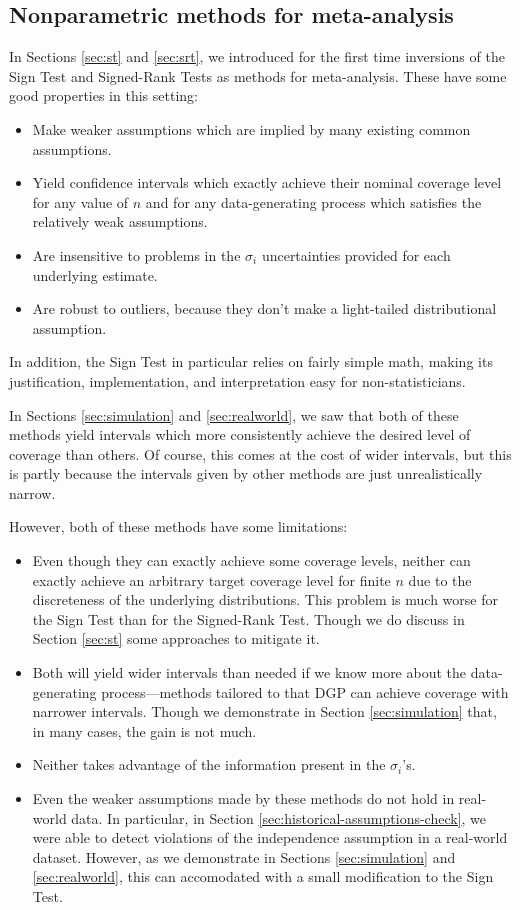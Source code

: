 \documentclass[letterpaper,12pt]{article}
\begin{document}
\subsection{Nonparametric methods for meta-analysis}
In Sections \ref{sec:st} and \ref{sec:srt}, we introduced for the first time inversions of the Sign Test and Signed-Rank Tests as methods for meta-analysis. These have some good properties in this setting:
\begin{itemize}
\item Make weaker assumptions which are implied by many existing common assumptions.
\item Yield confidence intervals which exactly achieve their nominal coverage level for any value of $n$ and for any data-generating process which satisfies the relatively weak assumptions.
\item Are insensitive to problems in the $\sigma_i$ uncertainties provided for each underlying estimate.
\item Are robust to outliers, because they don't make a light-tailed distributional assumption.
\end{itemize}
In addition, the Sign Test in particular relies on fairly simple math, making its justification, implementation, and interpretation easy for non-statisticians.

In Sections \ref{sec:simulation} and \ref{sec:realworld}, we saw that both of these methods yield intervals which more consistently achieve the desired level of coverage than others. Of course, this comes at the cost of wider intervals, but this is partly because the intervals given by other methods are just unrealistically narrow.

However, both of these methods have some limitations:
\begin{itemize}
\item Even though they can exactly achieve some coverage levels, neither can exactly achieve an arbitrary target coverage level for finite $n$ due to the discreteness of the underlying distributions. This problem is much worse for the Sign Test than for the Signed-Rank Test. Though we do discuss in Section \ref{sec:st} some approaches to mitigate it.
\item Both will yield wider intervals than needed if we know more about the data-generating process---methods tailored to that DGP can achieve coverage with narrower intervals. Though we demonstrate in Section \ref{sec:simulation} that, in many cases, the gain is not much.
\item Neither takes advantage of the information present in the $\sigma_i$'s.
\item Even the weaker assumptions made by these methods do not hold in real-world data. In particular, in Section \ref{sec:historical-assumptions-check}, we were able to detect violations of the independence assumption in a real-world dataset. However, as we demonstrate in Sections \ref{sec:simulation} and \ref{sec:realworld}, this can accomodated with a small modification to the Sign Test.
\end{itemize}
\end{document}
